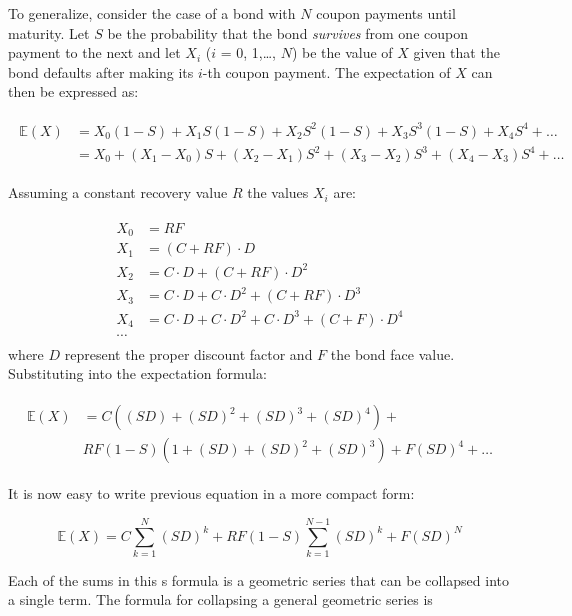 \begin{attention}
To generalize, consider the case of a bond with $N$ coupon payments until maturity. Let $S$ be the probability that the bond \emph{survives} from one coupon payment to the next and let $X_i$ ($i$ = 0, 1,\ldots, $N$) be the value of $X$ given that the bond defaults after making its $i$-th coupon payment. The expectation of $X$ can then be expressed as:

\begin{align}
\begin{split}
\mathbb{E}(X) &= X_0(1-S) + X_1 S(1-S) + X_2 S^2 (1-S) + X_3 S^3 (1-S) + X_4 S^4 + \ldots \\
&= X_0 + (X_1 - X_0)S + (X_2 - X_1)S^2 + (X_3 - X_2)S^3 + (X_4 - X_3)S^4 + \ldots
\end{split}
\end{align}

Assuming a constant recovery value $R$ the values $X_i$ are:

\begin{align}
\begin{split}
X_0 &= RF \\
X_1 &= (C + RF)\cdot D \\
X_2 &= C\cdot D + (C + RF)\cdot D^2 \\
X_3 &= C\cdot D + C\cdot D^2 + (C + RF)\cdot D^3 \\
X_4 &= C\cdot D + C\cdot D^2 + C\cdot D^3 + (C + F)\cdot D^4 \\
\cdots 
\end{split}
\end{align}
where $D$ represent the proper discount factor and $F$ the bond face value.
Substituting into the expectation formula:

\begin{align}
\begin{split}
\mathbb{E}(X) &= C((SD) + (SD)^2 + (SD)^3 + (SD)^4) + \\
&RF(1-S)(1+(SD)+(SD)^2 + (SD)^3) + F(SD)^4 + \ldots
\end{split}
\end{align}

It is now easy to write previous equation in a more compact form:

\begin{equation} 
\mathbb{E}(X) = C \sum_{k=1}^{N}{(SD)^k} + RF(1-S)\sum_{k=1}^{N-1}{(SD)^k} + F(SD)^N 
\end{equation}

Each of the sums in this s formula is a geometric series that can be collapsed into a single term. The formula for collapsing a general geometric series is 


\end{attention}
